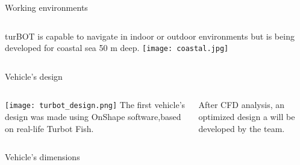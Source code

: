 \begin{frame}[t]{Working environments}
  \transdissolve[duration=0.5]
  \begin{columns}[c]
      turBOT is capable to navigate in indoor or outdoor environments but is being developed for coastal sea 50 m deep. 
      \texttt{[image: coastal.jpg]}
  \end{columns}
\end{frame}

\begin{frame}[t]{Vehicle's design}
  \transboxout[duration=0.5]
  \begin{columns}
      \texttt{[image: turbot\_design.png]}
      The first vehicle's design was made using OnShape software,based on real-life Turbot Fish. 

      After CFD analysis, an optimized design a will be developed by the team.
  \end{columns}
\end{frame}
\begin{frame}[t]{Vehicle's dimensions}
  \transdissolve[duration=0.5]
  \begin{columns}[c]
      
  \end{columns}
\end{frame}


